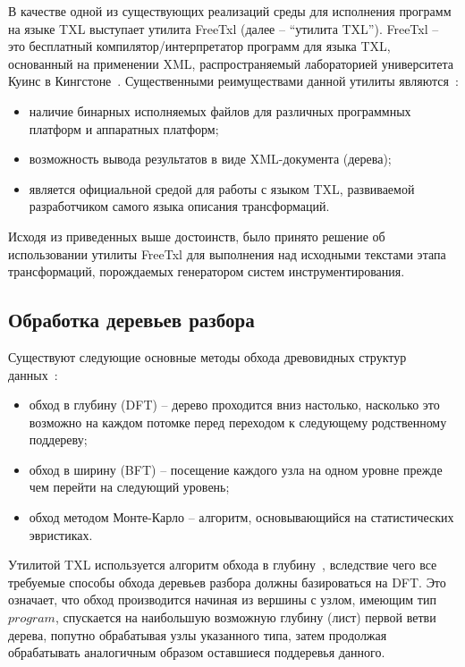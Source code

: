 В качестве одной из существующих реализаций среды для исполнения программ на языке TXL выступает утилита FreeTxl (далее -- ``утилита TXL'').
FreeTxl -- это бесплатный компилятор/интерпретатор программ для языка TXL, основанный на применении XML, распространяемый лабораторией университета Куинс в Кингстоне~\cite{txl-freetxl}.
Существенными реимуществами данной утилиты являются~\cite{txl-freetxl}:
\begin{itemize}[noitemsep]
  \item наличие бинарных исполняемых файлов для различных программных платформ и аппаратных платформ;
  \item возможность вывода результатов в виде XML-документа (дерева);
  \item является официальной средой для работы с языком TXL, развиваемой разработчиком самого языка описания трансформаций.
\end{itemize}

Исходя из приведенных выше достоинств, было принято решение об использовании утилиты FreeTxl для выполнения над исходными текстами этапа трансформаций, порождаемых генератором систем инструментирования.

\subsection{Обработка деревьев разбора}

Существуют следующие основные методы обхода древовидных структур данных~\cite{cormen2009introduction}:
\begin{itemize}[noitemsep]
  \item обход в глубину (DFT) -- дерево проходится вниз настолько, насколько это возможно на каждом потомке перед переходом к следующему родственному поддереву;
  \item обход в ширину (BFT) -- посещение каждого узла на одном уровне прежде чем перейти на следующий уровень;
  \item обход методом Монте-Карло -- алгоритм, основывающийся на статистических эвристиках.
\end{itemize}

Утилитой TXL используется алгоритм обхода в глубину~\cite{txl-about}, вследствие чего все требуемые способы обхода деревьев разбора должны базироваться на DFT.
Это означает, что обход производится начиная из вершины с узлом, имеющим тип $program$, спускается на наибольшую возможную глубину (лист) первой ветви дерева, попутно обрабатывая узлы указанного типа, затем продолжая обрабатывать аналогичным образом оставшиеся поддеревья данного.


